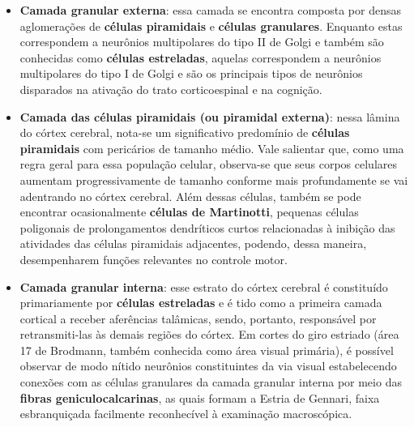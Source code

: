 \documentclass[
]{book}
\begin{document}
\begin{itemize}
\item
  \textbf{Camada granular externa}: essa camada se encontra composta por densas aglomerações de \textbf{células piramidais} e \textbf{células granulares}. Enquanto estas correspondem a neurônios multipolares do tipo II de Golgi e também são conhecidas como \textbf{células estreladas}, aquelas correspondem a neurônios multipolares do tipo I de Golgi e são os principais tipos de neurônios disparados na ativação do trato corticoespinal e na cognição.
\item
  \textbf{Camada das células piramidais (ou piramidal externa)}: nessa lâmina do córtex cerebral, nota-se um significativo predomínio de \textbf{células piramidais} com pericários de tamanho médio. Vale salientar que, como uma regra geral para essa população celular, observa-se que seus corpos celulares aumentam progressivamente de tamanho conforme mais profundamente se vai adentrando no córtex cerebral. Além dessas células, também se pode encontrar ocasionalmente \textbf{células de Martinotti}, pequenas células poligonais de prolongamentos dendríticos curtos relacionadas à inibição das atividades das células piramidais adjacentes, podendo, dessa maneira, desempenharem funções relevantes no controle motor.
\item
  \textbf{Camada granular interna}: esse estrato do córtex cerebral é constituído primariamente por \textbf{células estreladas} e é tido como a primeira camada cortical a receber aferências talâmicas, sendo, portanto, responsável por retransmiti-las às demais regiões do córtex. Em cortes do giro estriado (área 17 de Brodmann, também conhecida como área visual primária), é possível observar de modo nítido neurônios constituintes da via visual estabelecendo conexões com as células granulares da camada granular interna por meio das \textbf{fibras geniculocalcarinas}, as quais formam a Estria de Gennari, faixa esbranquiçada facilmente reconhecível à examinação macroscópica.
\end{itemize}
\end{document}
